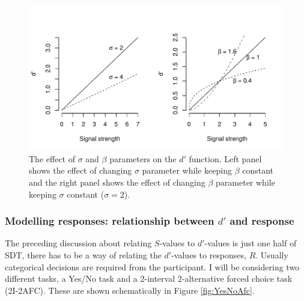 \documentclass{article}\usepackage{knitr}
\begin{document}
\begin{figure}[!htb]
\begin{center}
\begin{knitrout}
\color{fgcolor}
\includegraphics[width=\maxwidth]{figure/unnamed-chunk-3-1} 

\end{knitrout}
\end{center}
\caption{ The effect of $\sigma$ and $\beta$ parameters on the $d'$ function. Left panel shows the effect of changing $\sigma$ parameter while keeping $\beta$ constant and the right panel shows the effect of changing $\beta$ parameter while keeping $\sigma$ constant ($\sigma = 2$).}
\label{fig:dprimefunc}
\end{figure}

\subsubsection{Modelling responses: relationship between $d'$ and response}

The preceding discussion about relating $S$-values to $d'$-values is just one half of SDT, there has to be a way of relating the $d'$-values to responses, $R$. Usually categorical decisions are required from the participant. I will be considering two different tasks, a Yes/No task and a 2-interval 2-alternative forced choice task (2I-2AFC). These are shown schematically in Figure \ref{fig:YesNoAfc}.
\end{document}
